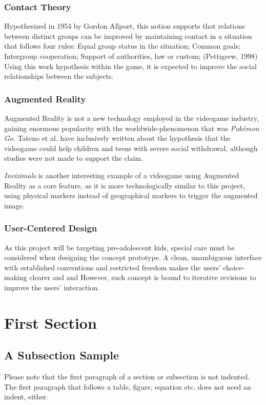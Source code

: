 \documentclass[runningheads]{llncs}
\begin{document}
\subsubsection{Contact Theory}
Hypothesized in 1954 by Gordon Allport, this notion supports that relations between distinct groups can be improved by maintaining contact in a situation that follows four rules: Equal group status in the situation; Common goals; Intergroup cooperation; Support of authorities, law or custom; (Pettigrew, 1998) Using this work hypothesis within the game, it is expected to improve the social relationships between the subjects.

\subsubsection{Augmented Reality}
Augmented Reality is not a new technology employed in the videogame industry, gaining enormous popularity with the worldwide-phenomenon that was \textit{Pokémon Go}. Tateno et al. have inclusively written about the hypothesis that the videogame could help children and teens with severe social withdrawal, although studies were not made to support the claim. 
\par \textit{Invizimals} is another interesting example of a videogame using Augmented Reality as a core feature, as it is more technologically similar to this project, using physical markers instead of geographical markers to trigger the augmented image.

\subsubsection{User-Centered Design}
As this project will be targeting pre-adolescent kids, special care must be considered when designing the concept prototype. A clean, unambiguous interface with established conventions and restricted freedom makes the users' choice-making clearer and and  However, such concept is bound to iterative revisions to improve the users' interaction.


\section{First Section}
\subsection{A Subsection Sample}
Please note that the first paragraph of a section or subsection is
not indented. The first paragraph that follows a table, figure,
equation etc. does not need an indent, either.
\end{document}
